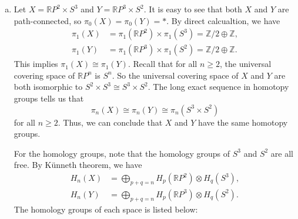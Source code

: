 \documentclass[a4paper, 12pt]{article}
\begin{document}
\begin{solution}
\begin{enumerate}[(a)]
\item Let \(X=\mathbb{R}P^2\times S^3\) and \(Y=\mathbb{R}P^3\times S^2\). It is easy to see that both \(X\) and \(Y\) are path-connected, so \(\pi_0(X)=\pi_0(Y)=*\). By direct calcualtion, we have 
\begin{align*}
	\pi_1(X)&=\pi_1(\mathbb{R}P^2)\times \pi_1(S^3)=\mathbb{Z}/2\oplus \mathbb{Z},\\ 
	\pi_1(Y)&=\pi_1(\mathbb{R}P^3)\times \pi_1(S^2)=\mathbb{Z}/2\oplus \mathbb{Z}.
\end{align*}
This implies \(\pi_1(X)\cong \pi_1(Y)\). Recall that for all \(n\geq 2\), the universal covering space of \(\mathbb{R}P^n\) is \(S^n\). So the universal covering space of \(X\) and \(Y\) are both isomorphic to 
\(S^2\times S^3\cong S^3\times S^2\). The long exact sequence in homotopy groups tells us that 
\[\pi_n(X)\cong \pi_n(Y)\cong \pi_n(S^3\times S^2)\]
for all \(n\geq 2\). Thus, we can conclude that \(X\) and \(Y\) have the same homotopy groups. 

For the homology groups, note that the homology groups of \(S^3\) and \(S^2\) are all free. By Künneth theorem, we have
\begin{align*}
	H_n(X)&=\bigoplus_{p+q=n}H_p(\mathbb{R}P^2)\otimes H_q(S^3),\\ 
	H_n(Y)&=\bigoplus_{p+q=n}H_p(\mathbb{R}P^3)\otimes H_q(S^2).
\end{align*} 
The homology groups of each space is listed below:
\begin{table}[h]
	\centering
	\end{table}
\end{enumerate}
\end{solution}
\end{document}
